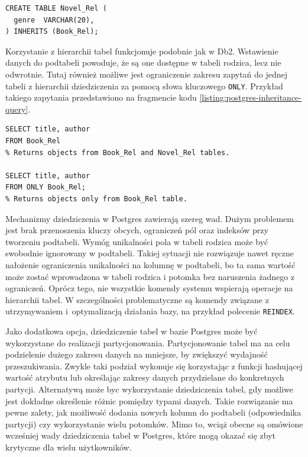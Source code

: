 \documentclass[a4paper,twoside,12pt]{book}
\begin{document}
\begin{lstlisting}[style=SQL, caption={Dziedziczenie tabeli w PostgreSQL.}, label={listing:postgres-inheritance}, captionpos=b]
CREATE TABLE Novel_Rel (
  genre  VARCHAR(20),
) INHERITS (Book_Rel);
\end{lstlisting}

Korzystanie z hierarchii tabel funkcjonuje podobnie jak w Db2. Wstawienie danych do podtabeli powoduje, że są one dostępne w tabeli rodzica, lecz nie odwrotnie. Tutaj również możliwe jest ograniczenie zakresu zapytań do jednej tabeli z hierarchii dziedziczenia za pomocą słowa kluczowego \lstinline{ONLY}. Przykład takiego zapytania przedstawiono na fragmencie kodu \ref{listing:postgres-inheritance-query}. 

\begin{lstlisting}[style=SQL, caption={Korzystanie z hierarchii tabel w PostgreSQL.}, label={listing:postgres-inheritance-query}, captionpos=b]
SELECT title, author
FROM Book_Rel
% Returns objects from Book_Rel and Novel_Rel tables.

SELECT title, author
FROM ONLY Book_Rel;
% Returns objects only from Book_Rel table.
\end{lstlisting}

Mechanizmy dziedziczenia w Postgres zawierają szereg wad. Dużym problemem jest brak przenoszenia kluczy obcych, ograniczeń pól oraz indeksów przy tworzeniu podtabeli. Wymóg unikalności pola w tabeli rodzica może być swobodnie ignorowany w podtabeli. Takiej sytuacji nie rozwiązuje nawet ręczne nałożenie ograniczenia unikalności na kolumnę w podtabeli, bo ta sama wartość może zostać wprowadzona w tabeli rodzica i potomka bez naruszenia żadnego z ograniczeń. Oprócz tego, nie wszystkie komendy systemu wspierają operacje na hierarchii tabel. W szczególności problematyczne są komendy związane z utrzymywaniem i~optymalizacją działania bazy, na przykład polecenie \lstinline{REINDEX}. 

Jako dodatkowa opcja, dziedziczenie tabel w bazie Postgres może być wykorzystane do realizacji partycjonowania. Partycjonowanie tabel ma na celu podzielenie dużego zakresu danych na mniejsze, by zwiększyć wydajność przeszukiwania. Zwykle taki podział wykonuje się korzystając z funkcji hashującej wartość atrybutu lub określając zakresy danych przydzielane do konkretnych partycji. Alternatywą może byc wykorzystanie dziedziczenia tabel, gdy możliwe jest dokładne określenie różnic pomiędzy typami danych. Takie rozwiązanie ma pewne zalety, jak możliwość dodania nowych kolumn do podtabeli (odpowiednika partycji) czy wykorzystanie wielu potomków. Mimo to, wciąż obecne są omówione wcześniej wady dziedziczenia tabel w Postgres, które mogą okazać się zbyt krytyczne dla wielu użytkowników.
\end{document}
